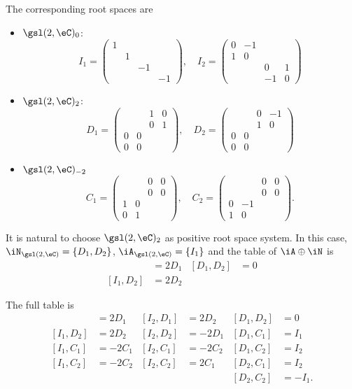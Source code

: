 The corresponding root spaces are
\begin{itemize}
\item $\gsl(2,\eC)_0$:
\[ 
  I_1=
\begin{pmatrix}
1\\&1\\&&-1\\&&&-1
\end{pmatrix},\quad
I_2=
\begin{pmatrix}
0&-1\\
1&0\\
&&0&1\\
&&-1&0
\end{pmatrix}
\]
\item $\gsl(2,\eC)_2$:
\[ 
  D_1=\begin{pmatrix}
&&1&0\\
&&0&1\\
0&0\\
0&0
\end{pmatrix},\quad
D_2=
\begin{pmatrix}
&&0&-1\\
&&1&0\\
0&0&\\
0&0&
\end{pmatrix}
\]
\item $\gsl(2,\eC)_{-2}$
\[ 
  C_1=\begin{pmatrix}
&&0&0\\
&&0&0\\
1&0\\
0&1
\end{pmatrix},\quad
C_2=\begin{pmatrix}
&&0&0\\
&&0&0\\
0&-1\\
1&0
\end{pmatrix}.
\]
\end{itemize}
It is natural to choose $\gsl(2,\eC)_2$ as positive root space system. In this case, $\iN_{\gsl(2,\eC)}=\{ D_1,D_2 \}$, $\iA_{\gsl(2,\eC)}=\{ I_1 \}$ and the table of $\iA\oplus\iN$ is
\begin{align}
[I_1,D_1]&=2D_1&		[D_1,D_2]&=0\\
[I_1,D_2]&=2D_2&		
\end{align}

    The full table is
\begin{align}
[I_1,D_1]&=2D_1&	[I_2,D_1]&=2D_2&	[D_1,D_2]&=0\\
[I_1,D_2]&=2D_2&	[I_2,D_2]&=-2D_1&	[D_1,C_1]&=I_1\\
[I_1,C_1]&=-2C_1&	[I_2,C_1]&=-2C_2&	[D_1,C_2]&=I_2\\
[I_1,C_2]&=-2C_2&	[I_2,C_2]&=2C_1&	[D_2,C_1]&=I_2\\
	&	&		&     &		[D_2,C_2]&=-I_1.
\end{align}
